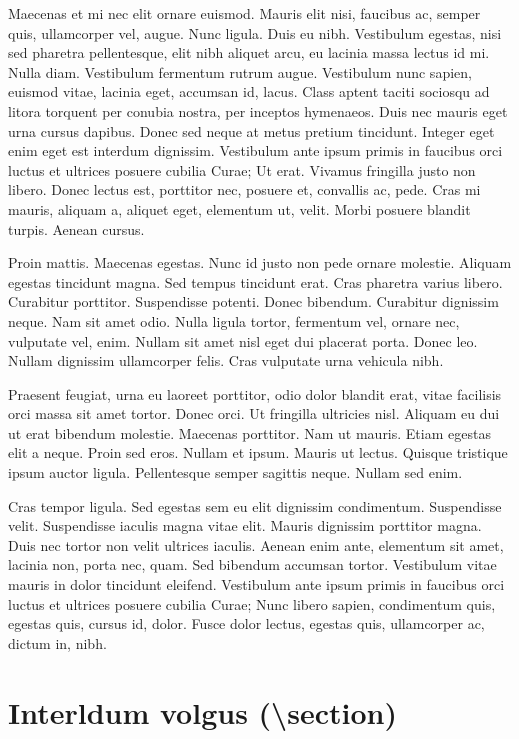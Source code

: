 \documentclass[article,colorback,accentcolor=tud4c]{tudreport}
\begin{document}
    Maecenas et mi nec elit ornare euismod. Mauris elit nisi, faucibus ac, semper quis, ullamcorper vel, augue. Nunc ligula. Duis eu nibh. Vestibulum egestas, nisi sed pharetra pellentesque, elit nibh aliquet arcu, eu lacinia massa lectus id mi. Nulla diam. Vestibulum fermentum rutrum augue. Vestibulum nunc sapien, euismod vitae, lacinia eget, accumsan id, lacus. Class aptent taciti sociosqu ad litora torquent per conubia nostra, per inceptos hymenaeos. Duis nec mauris eget urna cursus dapibus. Donec sed neque at metus pretium tincidunt. Integer eget enim eget est interdum dignissim. Vestibulum ante ipsum primis in faucibus orci luctus et ultrices posuere cubilia Curae; Ut erat. Vivamus fringilla justo non libero. Donec lectus est, porttitor nec, posuere et, convallis ac, pede. Cras mi mauris, aliquam a, aliquet eget, elementum ut, velit. Morbi posuere blandit turpis. Aenean cursus.

    Proin mattis. Maecenas egestas. Nunc id justo non pede ornare molestie. Aliquam egestas tincidunt magna. Sed tempus tincidunt erat. Cras pharetra varius libero. Curabitur porttitor. Suspendisse potenti. Donec bibendum. Curabitur dignissim neque. Nam sit amet odio. Nulla ligula tortor, fermentum vel, ornare nec, vulputate vel, enim. Nullam sit amet nisl eget dui placerat porta. Donec leo. Nullam dignissim ullamcorper felis. Cras vulputate urna vehicula nibh.

    Praesent feugiat, urna eu laoreet porttitor, odio dolor blandit erat, vitae facilisis orci massa sit amet tortor. Donec orci. Ut fringilla ultricies nisl. Aliquam eu dui ut erat bibendum molestie. Maecenas porttitor. Nam ut mauris. Etiam egestas elit a neque. Proin sed eros. Nullam et ipsum. Mauris ut lectus. Quisque tristique ipsum auctor ligula. Pellentesque semper sagittis neque. Nullam sed enim.

    Cras tempor ligula. Sed egestas sem eu elit dignissim condimentum. Suspendisse velit. Suspendisse iaculis magna vitae elit. Mauris dignissim porttitor magna. Duis nec tortor non velit ultrices iaculis. Aenean enim ante, elementum sit amet, lacinia non, porta nec, quam. Sed bibendum accumsan tortor. Vestibulum vitae mauris in dolor tincidunt eleifend. Vestibulum ante ipsum primis in faucibus orci luctus et ultrices posuere cubilia Curae; Nunc libero sapien, condimentum quis, egestas quis, cursus id, dolor. Fusce dolor lectus, egestas quis, ullamcorper ac, dictum in, nibh.

  \section{Interldum volgus (\textbackslash section)}
\end{document}
